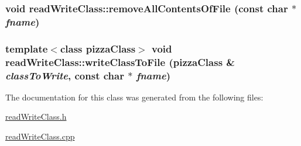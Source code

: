 \hypertarget{classread_write_class_40de8d6c8e60d97ea037a48a0096fcfb}{
\subsubsection[removeAllContentsOfFile]{\setlength{\rightskip}{0pt plus 5cm}void read\-Write\-Class::remove\-All\-Contents\-Of\-File (const char $\ast$ {\em fname})}}
\label{classread_write_class_40de8d6c8e60d97ea037a48a0096fcfb}


\hypertarget{classread_write_class_abb1ed8e2de573d0548c582c8df29de1}{
\subsubsection[writeClassToFile]{\setlength{\rightskip}{0pt plus 5cm}template$<$class pizza\-Class$>$ void read\-Write\-Class::write\-Class\-To\-File (pizza\-Class \& {\em class\-To\-Write}, const char $\ast$ {\em fname})}}
\label{classread_write_class_abb1ed8e2de573d0548c582c8df29de1}




The documentation for this class was generated from the following files:\begin{CompactItemize}
\item 
\hyperlink{read_write_class_8h}{read\-Write\-Class.h}\item 
\hyperlink{read_write_class_8cpp}{read\-Write\-Class.cpp}\end{CompactItemize}
